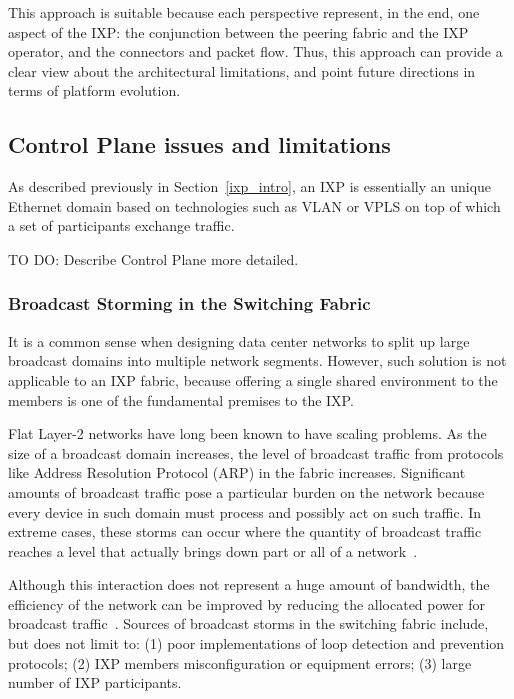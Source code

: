 \documentclass[conference]{IEEEtran/IEEEtran}
\begin{document}
This approach is suitable because each perspective represent, in the end, one aspect of the IXP: the conjunction between the peering fabric and the IXP operator, and the connectors and packet flow. Thus, this approach can provide a clear view about the architectural limitations, and point future directions in terms of platform evolution. 

\subsection{Control Plane issues and limitations}
\label{subsec:issues_cp}
As described previously in Section~\ref{ixp_intro}, an IXP is essentially an unique Ethernet domain based on technologies such as VLAN or VPLS on top of which a set of participants exchange traffic.

TO DO: Describe Control Plane more detailed. 

\subsubsection{Broadcast Storming in the Switching Fabric}
\label{subsubsec:broadcast_storm}
It is a common sense when designing data center networks to split up large broadcast domains into multiple network segments. However, such solution is not applicable to an IXP fabric, because offering a single shared environment to the members is one of the fundamental premises to the IXP. 

Flat Layer-2 networks have long been known to have scaling problems. As the size of a broadcast domain increases, the level of broadcast traffic from protocols like Address Resolution Protocol (ARP) in the fabric increases. Significant amounts of broadcast traffic pose a particular burden on the network because every device in such domain must process and possibly act on such traffic. In extreme cases, these storms can occur where the quantity of broadcast traffic reaches a level that actually brings down part or all of a network~\cite{rfc6820}. 

Although this interaction does not represent a huge amount of bandwidth, the efficiency of the network can be improved by reducing the allocated power for broadcast traffic~\cite{ams2013victor}. Sources of broadcast storms in the switching fabric include, but does not limit to: (1) poor implementations of loop detection and prevention protocols; (2) IXP members misconfiguration or equipment errors; (3) large number of IXP participants. 
\end{document}
